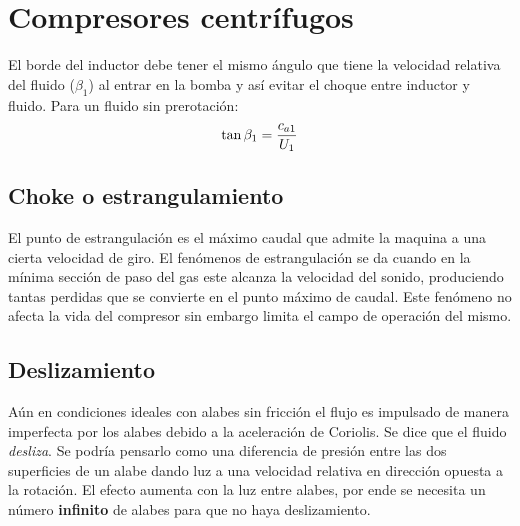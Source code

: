 \documentclass{article}
\begin{document}
\section{Compresores centrífugos}


El borde del inductor debe tener el mismo ángulo que tiene la velocidad relativa del fluido ($\beta_1$) al entrar en la bomba y así evitar el choque entre inductor y fluido. Para un fluido sin prerotación:
\[
\tan \beta_1 = \frac{c_{a 1}}{U_1}
\]

\subsection{Choke o estrangulamiento}
El punto de estrangulación es el máximo caudal que admite
la maquina a una cierta velocidad de giro.   
El fenómenos de estrangulación se da cuando en la mínima
sección de paso del gas este alcanza la velocidad del sonido,
produciendo tantas perdidas que se convierte en el punto
máximo de caudal.
Este fenómeno no afecta la vida del compresor sin embargo
limita el campo de operación del mismo.

\subsection{Deslizamiento}
Aún en condiciones ideales con alabes sin fricción el flujo es impulsado de manera imperfecta por los alabes debido a la aceleración de Coriolis. Se dice que el fluido \textit{desliza}. Se podría pensarlo como una diferencia de presión entre las dos superficies de un alabe dando luz a una velocidad relativa en dirección opuesta a la rotación. El efecto aumenta con la luz entre alabes, por ende se necesita un número \textbf{infinito} de alabes para que no haya deslizamiento.
\end{document}
